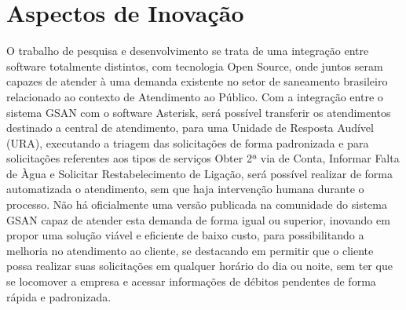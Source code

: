 \section{Aspectos de Inovação}
O trabalho de pesquisa e desenvolvimento se trata de uma integração entre software totalmente distintos, com tecnologia Open Source, onde juntos seram capazes de atender à uma demanda existente no setor de saneamento brasileiro relacionado ao contexto de Atendimento ao Público. Com a integração entre o sistema GSAN com o software Asterisk, será possível transferir os atendimentos destinado a central de atendimento, para uma Unidade de Resposta Audível (URA), executando a triagem das solicitações de forma padronizada e para solicitações referentes aos tipos de serviços Obter 2ª via de Conta, Informar Falta de Àgua e Solicitar Restabelecimento de Ligação, será possível realizar de forma automatizada o atendimento, sem que haja intervenção humana durante o processo. 
Não há oficialmente uma versão publicada na comunidade do sistema GSAN capaz de atender esta demanda de forma igual ou superior, inovando em propor uma solução viável e eficiente de baixo custo, para possibilitando a melhoria no atendimento ao cliente, se destacando em permitir que o cliente possa realizar suas solicitações em qualquer horário do dia ou noite, sem ter que se locomover a empresa e acessar informações de débitos pendentes de forma rápida e padronizada.
